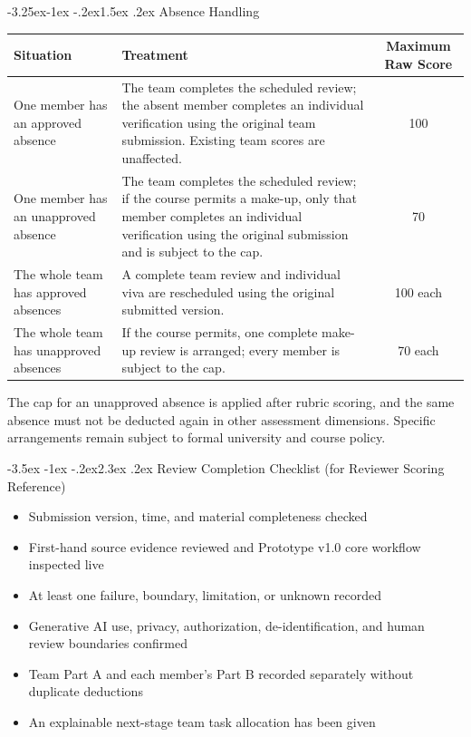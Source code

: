 \documentclass[11pt]{article}
\makeatletter
\renewcommand\section{\@startsection{section}{1}{\z@}%
    {-3.5ex \@plus -1ex \@minus -.2ex}{2.3ex \@plus.2ex}%
    {\normalfont\Large\sffamily\bfseries}}
\renewcommand\subsection{\@startsection{subsection}{2}{\z@}%
    {-3.25ex\@plus -1ex \@minus -.2ex}{1.5ex \@plus .2ex}%
    {\normalfont\large\sffamily\bfseries}}
\newcommand{\formaltable}{%
  \small
  \setlength{\tabcolsep}{5pt}%
  \renewcommand{\arraystretch}{1.2}%
  \setlength{\arrayrulewidth}{0.4pt}%
}
\renewcommand{\arraystretch}{1.2}
\makeatother
\begin{document}
\subsection{Absence Handling}
\begin{center}
\formaltable
\begin{tabularx}{\textwidth}{|l|Y|c|}
\hline
\textbf{Situation} & \textbf{Treatment} & \textbf{Maximum Raw Score} \\ \hline
One member has an approved absence & The team completes the scheduled review; the absent member completes an individual verification using the original team submission. Existing team scores are unaffected. & 100 \\ \hline
One member has an unapproved absence & The team completes the scheduled review; if the course permits a make-up, only that member completes an individual verification using the original submission and is subject to the cap. & 70 \\ \hline
The whole team has approved absences & A complete team review and individual viva are rescheduled using the original submitted version. & 100 each \\ \hline
The whole team has unapproved absences & If the course permits, one complete make-up review is arranged; every member is subject to the cap. & 70 each \\ \hline
\end{tabularx}
\end{center}

\noindent The cap for an unapproved absence is applied after rubric scoring, and the same absence must not be deducted again in other assessment dimensions. Specific arrangements remain subject to formal university and course policy.

\section{Review Completion Checklist (for Reviewer Scoring Reference)}
\begin{itemize}[label=$\mdlgwhtsquare$]
  \item Submission version, time, and material completeness checked
  \item First-hand source evidence reviewed and Prototype v1.0 core workflow inspected live
  \item At least one failure, boundary, limitation, or unknown recorded
  \item Generative AI use, privacy, authorization, de-identification, and human review boundaries confirmed
  \item Team Part A and each member's Part B recorded separately without duplicate deductions
  \item An explainable next-stage team task allocation has been given
\end{itemize}
\end{document}
